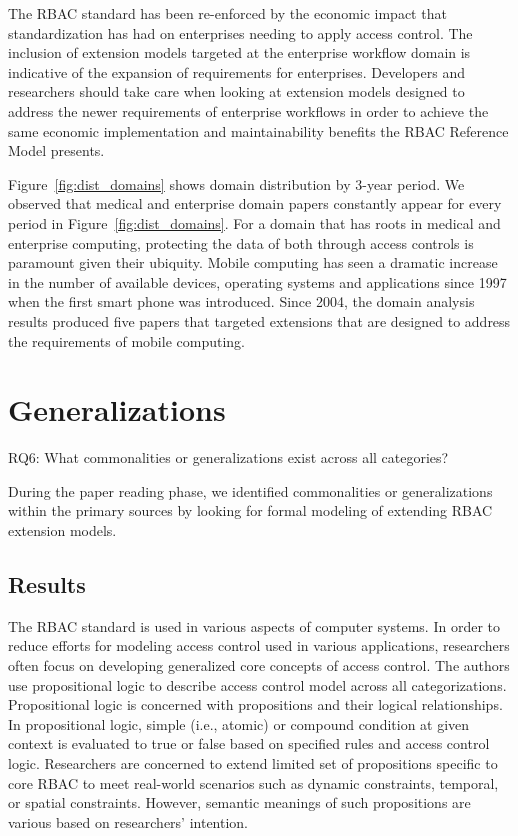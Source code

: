 The RBAC standard has been re-enforced by the economic impact that standardization has had on enterprises needing to apply access control.  The
inclusion of extension models targeted at the enterprise workflow domain is indicative of the expansion of requirements for enterprises. Developers
and researchers should take care when looking at extension models designed to address the newer requirements of enterprise workflows in order to
achieve the same economic implementation and maintainability benefits the RBAC Reference Model presents.

Figure~\ref{fig:dist_domains} shows domain distribution by 3-year period.
We observed that medical and enterprise domain papers constantly appear for every period in Figure~\ref{fig:dist_domains}.
For a domain that has roots in medical and enterprise computing, protecting the data of both through access controls is paramount given their ubiquity. 
Mobile computing has seen a dramatic increase in the number of available devices, operating systems and applications since 1997 when the first smart phone was introduced. Since 2004, the domain analysis results produced five papers that targeted extensions that are designed to address the requirements of mobile computing. 


\section{Generalizations} \label{sec:generalizations}

RQ6: What commonalities or generalizations exist across all categories?

During the paper reading phase, we identified commonalities or generalizations within the primary sources 
by looking for formal modeling of extending RBAC extension models.

\subsection{Results}

The RBAC standard is used in various aspects of computer systems. In order to reduce efforts for modeling access control used in various applications, researchers often focus on developing generalized core concepts of access control.
The authors use propositional logic to describe access control model across all categorizations. Propositional logic is concerned with propositions and their logical relationships. In propositional logic, simple (i.e., atomic) or compound condition at given context is evaluated to true or false based on specified rules and access control logic. Researchers are concerned to extend limited set of propositions specific to core RBAC to meet real-world scenarios such as dynamic constraints, temporal, or spatial constraints. However, semantic meanings of such propositions are various based on researchers' intention.


